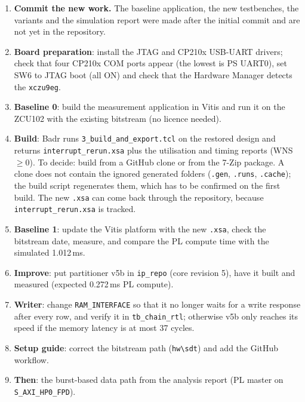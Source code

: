 \documentclass[11pt,a4paper]{article}
\newcommand{\code}[1]{\texttt{#1}}
\begin{document}
\begin{enumerate}[noitemsep]
  \item \textbf{Commit the new work.} The baseline application, the new testbenches, the variants and the simulation report were made after the initial commit and are not yet in the repository.
  \item \textbf{Board preparation}: install the JTAG and CP210x USB-UART drivers; check that four CP210x COM ports appear (the lowest is PS UART0), set SW6 to JTAG boot (all ON) and check that the Hardware Manager detects the \code{xczu9eg}.
  \item \textbf{Baseline 0}: build the measurement application in Vitis and run it on the ZCU102 with the existing bitstream (no licence needed).
  \item \textbf{Build}: Badr runs \code{3\_build\_and\_export.tcl} on the restored design and returns \code{interrupt\_rerun.xsa} plus the utilisation and timing reports (WNS $\geq 0$). To decide: build from a GitHub clone or from the 7-Zip package. A clone does not contain the ignored generated folders (\code{.gen}, \code{.runs}, \code{.cache}); the build script regenerates them, which has to be confirmed on the first build. The new \code{.xsa} can come back through the repository, because \code{interrupt\_rerun.xsa} is tracked.
  \item \textbf{Baseline 1}: update the Vitis platform with the new \code{.xsa}, check the bitstream date, measure, and compare the PL compute time with the simulated 1.012\,ms.
  \item \textbf{Improve}: put partitioner v5b in \code{ip\_repo} (core revision 5), have it built and measured (expected 0.272\,ms PL compute).
  \item \textbf{Writer}: change \code{RAM\_INTERFACE} so that it no longer waits for a write response after every row, and verify it in \code{tb\_chain\_rtl}; otherwise v5b only reaches its speed if the memory latency is at most 37 cycles.
  \item \textbf{Setup guide}: correct the bitstream path (\code{hw\textbackslash sdt}) and add the GitHub workflow.
  \item \textbf{Then}: the burst-based data path from the analysis report (PL master on \code{S\_AXI\_HP0\_FPD}).
\end{enumerate}
\end{document}
